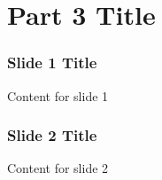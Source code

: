 \section{Part 3 Title}

\begin{frame}
\frametitle{Slide 1 Title}
Content for slide 1
\end{frame}


\begin{frame}
\frametitle{Slide 2 Title}
Content for slide 2
\end{frame}
